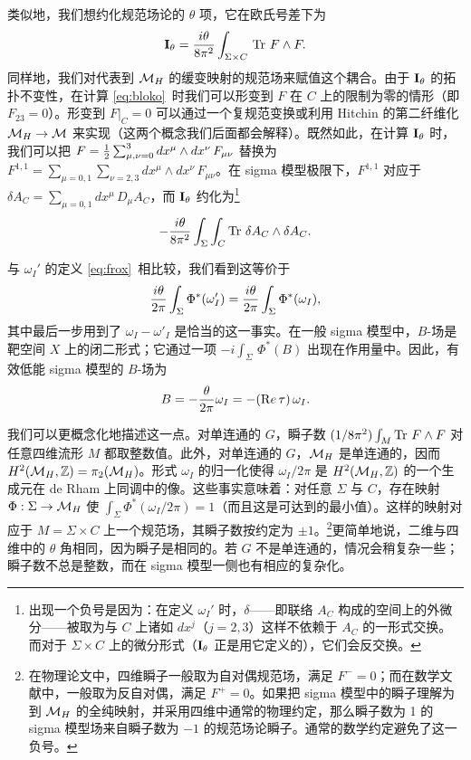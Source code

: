 类似地，我们想约化规范场论的 $\theta$ 项，它在欧氏号差下为%
\setcounter{equation}{15}
\begin{equation}\label{eq:bloko}
{\cmmib
I}_\theta={i\theta\over 8\pi^2}\int_{\Sigma\times C}\,\Tr\,
F\wedge F.
\end{equation}
同样地，我们对代表到 $\MH$ 的缓变映射的规范场来赋值这个耦合。由于 ${{\cmmib I}}_\theta$ 的拓扑不变性，在计算 \eqref{eq:bloko}\ 时我们可以形变到 $F$ 在 $C$ 上的限制为零的情形（即 $F_{23}=0$）。形变到 $F|_C=0$ 可以通过一个复规范变换或利用 Hitchin 的第二纤维化 $\MH\to\M$ 来实现（这两个概念我们后面都会解释）。既然如此，在计算 ${\cmmib I}_\theta$ 时，我们可以把 $F={1\over 2}\sum_{\mu,\nu=0}^3dx^\mu\wedge dx^\nu \,F_{\mu\nu}$ 替换为 $F^{1,1}=\sum_{\mu=0,1}\sum_{\nu=2,3}dx^\mu\wedge dx^\nu \,F_{\mu\nu}$。在 sigma 模型极限下，$F^{1,1}$ 对应于 $\delta A_C=\sum_{\mu=0,1}dx^\mu \,D_\mu A_C$，而 ${\cmmib I}_\theta$ 约化为\footnote{出现一个负号是因为：在定义 $\omega_I'$ 时，$\delta$——即联络 $A_C$ 构成的空间上的外微分——被取为与 $C$ 上诸如 $dx^ j$（$j=2,3$）这样不依赖于 $A_C$ 的一形式交换。而对于 $\Sigma\times C$ 上的微分形式（${\cmmib I}_\theta$ 正是用它定义的），它们会反交换。}
\setcounter{equation}{16}
\begin{equation}\label{eq:ino}
-{i\theta\over 8\pi^2}\int_\Sigma \int_C \Tr\,\delta
A_C\wedge \delta A_C.
\end{equation}

与 $\omega_I'$ 的定义 \eqref{eq:frox}\ 相比较，我们看到这等价于%
\setcounter{equation}{17}
\begin{equation}\label{eq:zinok}
{i\theta\over
2\pi}\int_\Sigma\Phi^*(\omega'_{I})={i\theta\over 2\pi}\int_\Sigma
\Phi^*(\omega_I),
\end{equation}
其中最后一步用到了 $\omega_{I}-\omega'_{I}$ 是恰当的这一事实。在一般 sigma 模型中，$B$-场是靶空间 $X$ 上的闭二形式；它通过一项 $-i\int_\Sigma\,\Phi^*(B)$ 出现在作用量中。因此，有效低能 sigma 模型的 $B$-场为
\setcounter{equation}{18}
\begin{equation}\label{eq:palooka}
B=-{\theta\over 2\pi}\omega_I=-({\rm
Re}\,\tau)\,\omega_I.
\end{equation}

我们可以更概念化地描述这一点。对单连通的 $G$，瞬子数 $(1/8\pi^2)\int_M \Tr\,F\wedge F$ 对任意四维流形 $M$ 都取整数值。此外，对单连通的 $G$，$\MH$ 是单连通的，因而 $H^2(\MH,\Bbb{Z})=\pi_2(\MH)$。形式 $\omega_I$ 的归一化使得 $\omega_I/2\pi$ 是 $H^2(\MH,\Bbb{Z})$ 的一个生成元在 de Rham 上同调中的像。这些事实意味着：对任意 $\Sigma$ 与 $C$，存在映射 $\Phi:\Sigma\to \MH$ 使 $\int_\Sigma\Phi^*(\omega_I/2\pi)=1$（而且这是可达到的最小值）。这样的映射对应于 $M=\Sigma\times C$ 上一个规范场，其瞬子数按约定为 $\pm 1$。\footnote{在物理论文中，四维瞬子一般取为自对偶规范场，满足 $F^-=0$；而在数学文献中，一般取为反自对偶，满足 $F^+=0$。如果把 sigma 模型中的瞬子理解为到 $\MH$ 的全纯映射，并采用四维中通常的物理约定，那么瞬子数为 1 的 sigma 模型场来自瞬子数为 $-1$ 的规范场论瞬子。通常的数学约定避免了这一负号。}更简单地说，二维与四维中的 $\theta$ 角相同，因为瞬子是相同的。若 $G$ 不是单连通的，情况会稍复杂一些；瞬子数不总是整数，而在 sigma 模型一侧也有相应的复杂化。

